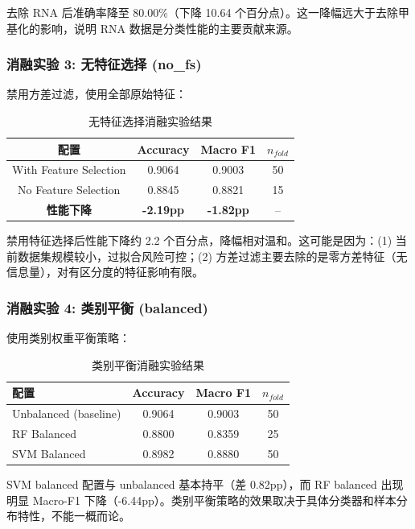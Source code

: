去除 RNA 后准确率降至 80.00\%（下降 10.64 个百分点）。这一降幅远大于去除甲基化的影响，说明 RNA 数据是分类性能的主要贡献来源。

\subsubsection{消融实验 3: 无特征选择 (no\_fs)}

禁用方差过滤，使用全部原始特征：

\begin{table}[htbp]
\centering
\caption{无特征选择消融实验结果}
\label{tab:ablation_no_fs}
\begin{tabular}{|c|ccc|}
\hline
\textbf{配置} & \textbf{Accuracy} & \textbf{Macro F1} & $n_{fold}$ \\
\hline
With Feature Selection & 0.9064 & 0.9003 & 50 \\
No Feature Selection & 0.8845 & 0.8821 & 15 \\
\textbf{性能下降} & \textbf{-2.19pp} & \textbf{-1.82pp} & -- \\
\hline
\end{tabular}
\end{table}

禁用特征选择后性能下降约 2.2 个百分点，降幅相对温和。这可能是因为：(1) 当前数据集规模较小，过拟合风险可控；(2) 方差过滤主要去除的是零方差特征（无信息量），对有区分度的特征影响有限。

\subsubsection{消融实验 4: 类别平衡 (balanced)}

使用类别权重平衡策略：

\begin{table}[htbp]
\centering
\caption{类别平衡消融实验结果}
\label{tab:ablation_balanced}
\begin{tabular}{|l|ccc|}
\hline
\textbf{配置} & \textbf{Accuracy} & \textbf{Macro F1} & $n_{fold}$ \\
\hline
Unbalanced (baseline) & 0.9064 & 0.9003 & 50 \\
RF Balanced & 0.8800 & 0.8359 & 25 \\
SVM Balanced & 0.8982 & 0.8880 & 50 \\
\hline
\end{tabular}
\end{table}

SVM balanced 配置与 unbalanced 基本持平（差 0.82pp），而 RF balanced 出现明显 Macro-F1 下降（-6.44pp）。类别平衡策略的效果取决于具体分类器和样本分布特性，不能一概而论。

